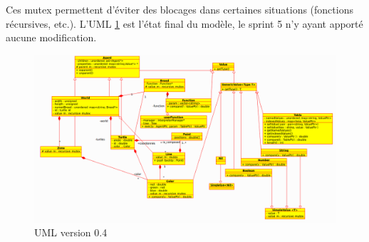 Ces mutex permettent d'éviter des blocages dans certaines situations (fonctions récursives, etc.).
L'UML \ref{v0.4} est l'état final du modèle, le sprint 5 n'y ayant apporté aucune modification.
\begin{figure}[h]
\centering
\includegraphics[scale=0.55, angle=90]{doc/report/uml/v04.png}
\caption{\label{v0.4} UML version 0.4}
\end{figure}

